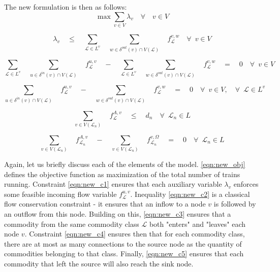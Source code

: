 \newpage
The new formulation is then as follows:
\newline
\newline
\begin{equation}
	\label{eqn:new_obj}
    \displaystyle \max   \displaystyle  \sum_{v\in V} \lambda_{v} \quad \forall \quad v \in V
\end{equation}
 
\begin{equation}
  \label{eqn:new_c1}
  \lambda_{v} \quad \leq \quad \displaystyle \sum_{\mathscr{L} \in L^v} \quad \sum_{w \in \delta^{out}(v) \cap V(\mathscr{L})} \quad f^{v, w}_{\mathscr{L}} \quad \forall \enspace v \in V
\end{equation}

\begin{equation}
	\label{eqn:new_c2}
\displaystyle \sum_{\mathscr{L} \in L^v} \quad \sum_{u \in \delta^{in}(v) \cap V(\mathscr{L})} \quad f^{u, v}_{\mathscr{L}} \quad - \quad \sum_{\mathscr{L} \in L^v} \quad \sum_{w \in \delta^{out}(v) \cap V(\mathscr{L})} \quad f^{v, w}_{\mathscr{L}} \quad = \quad 0 \quad \forall \enspace v \in V
\end{equation}

\begin{equation}
	\label{eqn:new_c3}
\displaystyle \sum_{u \in \delta^{in}(v) \cap V(\mathscr{L})} \quad f^{u, v}_{\mathscr{L}} \quad - \quad \sum_{w \in \delta^{out}(v) \cap V(\mathscr{L})} \quad f^{v, w}_{\mathscr{L}} \quad = \quad 0 \quad \forall \enspace v \in V, \quad \forall \enspace \mathscr{L} \in L^v
\end{equation}

\begin{equation}
	\label{eqn:new_c4}
\displaystyle \sum_{v \in V(\mathscr{L}_n)} \quad f^{A, v}_{\mathscr{L}} \quad \leq \quad d_n \quad \forall \enspace \mathscr{L}_n \in L
\end{equation}

\begin{equation}
	\label{eqn:new_c5}
\displaystyle \sum_{v \in V(\mathscr{L}_n)} \quad f^{A, v}_{\mathscr{L}_n} \quad - \quad \sum_{v \in V(\mathscr{L}_n)} \quad f^{v, \Omega}_{\mathscr{L}_n} \quad = \quad 0 \quad \forall \enspace \mathscr{L}_n \in L
\end{equation}

Again, let us briefly discuss each of the elements of the model. \ref{eqn:new_obj} defines the objective function as maximization of the total number of trains running. Constraint \ref{eqn:new_c1} ensures that each auxiliary variable $\lambda_v$ enforces some feasible incoming flow variable $f^{u, v}_\mathscr{L}$. Inequality \ref{eqn:new_c2} is a classical flow conservation constraint - it ensures that an inflow to a node $v$ is followed by an outflow from this node. Building on this, \ref{eqn:new_c3} ensures that a commodity from the same commodity class $\mathscr{L}$ both "enters" and "leaves" each node $v$. Constraint \ref{eqn:new_c4} ensures then that for each commodity class, there are at most as many connections to the source node as the quantity of commodities belonging to that class. Finally, \ref{eqn:new_c5} ensures that each commodity that left the source will also reach the sink node. 

